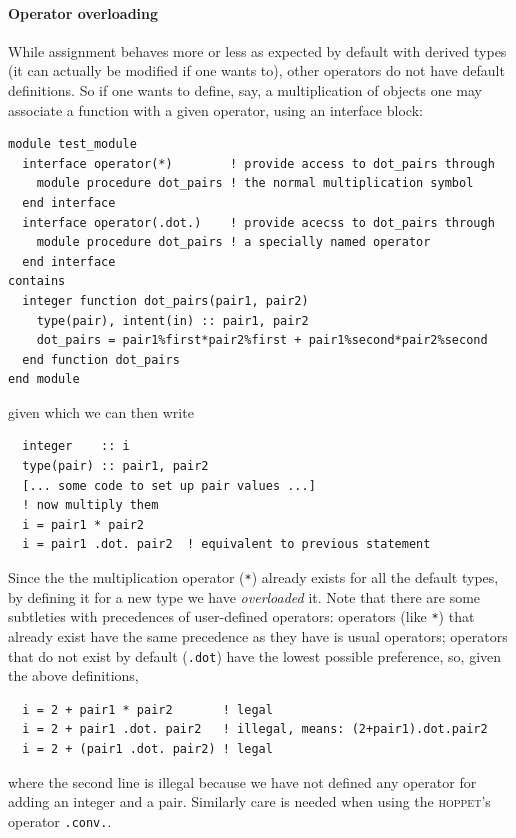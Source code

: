 \documentclass[12pt]{article}
\newcommand{\hoppet}{\textsc{hoppet}\xspace}
\begin{document}
\paragraph{Operator overloading} While assignment behaves more or less
as expected by default with derived types (it can actually be modified
if one wants to), other operators do not have default definitions. So
if one wants to define, say, a multiplication of objects one may
associate a function with a given operator, using an interface block:
\begin{verbatim}
module test_module
  interface operator(*)        ! provide access to dot_pairs through 
    module procedure dot_pairs ! the normal multiplication symbol
  end interface 
  interface operator(.dot.)    ! provide acecss to dot_pairs through
    module procedure dot_pairs ! a specially named operator
  end interface 
contains
  integer function dot_pairs(pair1, pair2)
    type(pair), intent(in) :: pair1, pair2
    dot_pairs = pair1%first*pair2%first + pair1%second*pair2%second
  end function dot_pairs
end module
\end{verbatim}
given which we can then write
\begin{verbatim}
  integer    :: i
  type(pair) :: pair1, pair2
  [... some code to set up pair values ...]
  ! now multiply them
  i = pair1 * pair2
  i = pair1 .dot. pair2  ! equivalent to previous statement
\end{verbatim}
Since the the multiplication operator (\texttt{*}) already exists for
all the default types, by defining it for a new type we have
\emph{overloaded} it. Note that there are some subtleties with
precedences of user-defined operators: operators (like \texttt{*})
that already exist have the same precedence as they have is usual
operators; operators that do not exist by default (\texttt{.dot}) have
the lowest possible preference, so, given the above definitions,
\begin{verbatim}
  i = 2 + pair1 * pair2       ! legal
  i = 2 + pair1 .dot. pair2   ! illegal, means: (2+pair1).dot.pair2
  i = 2 + (pair1 .dot. pair2) ! legal
\end{verbatim}
where the second line is illegal because we have not defined any
operator for adding an integer and a pair. Similarly care is needed
when using the \hoppet's operator \texttt{.conv.}.
\end{document}
